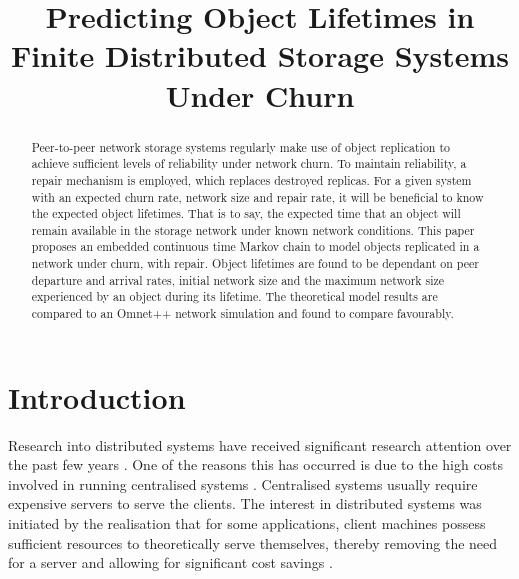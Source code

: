 \documentclass[10pt,a4paper,conference]{IEEEtran}
\begin{document}
%
\title{Predicting Object Lifetimes in Finite Distributed Storage Systems Under Churn}

\author{}

\maketitle

\begin{abstract}
Peer-to-peer network storage systems regularly make use of object replication to achieve sufficient levels of reliability under network churn. To maintain reliability, a repair mechanism is employed, which replaces destroyed replicas. For a given system with an expected churn rate, network size and repair rate, it will be beneficial to know the expected object lifetimes. That is to say, the expected time that an object will remain available in the storage network under known network conditions. This paper proposes an embedded continuous time Markov chain to model objects replicated in a network under churn, with repair. Object lifetimes are found to be dependant on peer departure and arrival rates, initial network size and the maximum network size experienced by an object during its lifetime. The theoretical model results are compared to an Omnet++ network simulation and found to compare favourably.
\end{abstract}

\section{Introduction}
\label{introduction}

Research into distributed systems have received significant research attention over the past few years \cite{}. One of the reasons this has occurred is due to the high costs involved in running centralised systems \cite{}. Centralised systems usually require expensive servers to serve the clients. The interest in distributed systems was initiated by the realisation that for some applications, client machines possess sufficient resources to theoretically serve themselves, thereby removing the need for a server and allowing for significant cost savings \cite{}.
\end{document}
